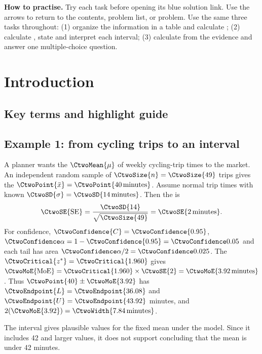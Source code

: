 \textbf{How to practise.} Try each task before opening its blue solution link. Use the arrows to return to the contents, problem list, or problem. Use the same three tasks throughout: (1) organize the information in a table and calculate ; (2) calculate , state and interpret each interval; (3) calculate  from the evidence and answer one multiple-choice question.

\clearpage
\section{Introduction}
\label{sec:introduction}

\noindent\begin{minipage}{\linewidth}
\subsection{Key terms and highlight guide}
\label{subsec:c2-key-terms}
\label{tab:highlight-legend}
\end{minipage}\par

\noindent\begin{minipage}{\linewidth}
\subsection{Example 1: from cycling trips to an interval}
\label{subsec:c2-cycling-example}
A planner wants the  $\CtwoMean{\mu}$ of weekly cycling-trip times to the market. An independent random sample of $\CtwoSize{n}=\CtwoSize{49}$ trips gives the  $\CtwoPoint{\bar{x}}=\CtwoPoint{40\,\text{minutes}}$. Assume normal trip times with known  $\CtwoSD{\sigma}=\CtwoSD{14\,\text{minutes}}$. Then the  is
\[
\CtwoSE{\mathrm{SE}}=\frac{\CtwoSD{14}}{\sqrt{\CtwoSize{49}}}=\CtwoSE{2\,\text{minutes}}.
\]
For  confidence, $\CtwoConfidence{C}=\CtwoConfidence{0.95}$, $\CtwoSignificance{\alpha}=1-\CtwoConfidence{0.95}=\CtwoSignificance{0.05}$ and each tail has area $\CtwoSignificance{\alpha}/2=\CtwoSignificance{0.025}$. The  $\CtwoCritical{z^*}=\CtwoCritical{1.960}$ gives  $\CtwoMoE{\mathrm{MoE}}=\CtwoCritical{1.960}\times\CtwoSE{2}=\CtwoMoE{3.92\,\text{minutes}}$. Thus $\CtwoPoint{40}\pm\CtwoMoE{3.92}$ has  $\CtwoEndpoint{L}=\CtwoEndpoint{36.08}$ and $\CtwoEndpoint{U}=\CtwoEndpoint{43.92}$ minutes, and  $2(\CtwoMoE{3.92})=\CtwoWidth{7.84\,\text{minutes}}$.

The interval gives plausible values for the fixed mean under the model. Since it includes 42 and larger values, it does not support concluding that the mean is under 42 minutes.
\end{minipage}\par

